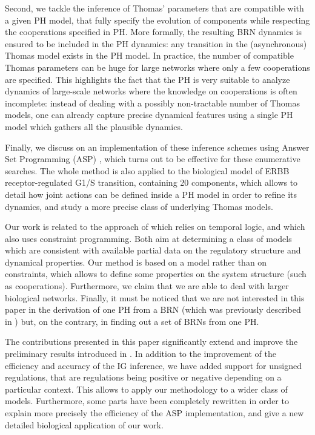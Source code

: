 Second, we tackle the inference of Thomas' parameters that are compatible with a given PH
model, \ie that fully specify the evolution of components while respecting the cooperations
specified in PH.
More formally, the resulting BRN dynamics is ensured to be included in the PH dynamics: any
transition in the (asynchronous) Thomas model exists in the PH model.
In practice, the number of compatible Thomas parameters can be huge for large networks where only a
few cooperations are specified.
This highlights the fact that the PH is very suitable to analyze dynamics of large-scale networks
where the knowledge on cooperations is often incomplete:
instead of dealing with a possibly non-tractable number of Thomas models, one can already capture
precise dynamical features using a single PH model which gathers all the plausible dynamics.

Finally, we discuss on an implementation of these inference schemes using Answer Set
Programming (ASP) \cite{Baral03},  which turns out to be effective for these enumerative searches.
The whole method is also applied to the biological model of ERBB receptor-regulated G1/S transition,
containing 20 components,
which allows to detail how joint actions can be defined inside a PH model in order
to refine its dynamics, and study a more precise class of underlying Thomas models.

Our work is related to the approach of \cite{Khalis09} which relies on temporal logic, and \cite{20646302,DBLP:conf/ipcat/CorblinFTCT12} which also uses constraint programming.
Both aim at determining a class of models which are consistent with available partial data on the regulatory structure and dynamical properties.
Our method is based on a model rather than on constraints, which allows to define some properties on the system structure (such as cooperations).
Furthermore, we claim that we are able to deal with larger biological networks.
Finally, it must be noticed that we are not interested in this paper in the derivation of one PH
from a BRN (which was previously described in \cite{PMR10-TCSB}) but, on the contrary, in finding
out a set of BRNs from one PH.

The contributions presented in this paper significantly extend and improve the preliminary results
introduced in \cite{FPIMR12-CMSB}.
In addition to the improvement of the efficiency and accuracy of the IG inference, we have added support for
unsigned regulations, that are regulations being positive or negative depending on a particular
context.
This allows to apply our methodology to a wider class of models.
Furthermore, some parts have been completely rewritten in order to explain more precisely the efficiency of the ASP implementation,
and give a new detailed biological application of our work.

